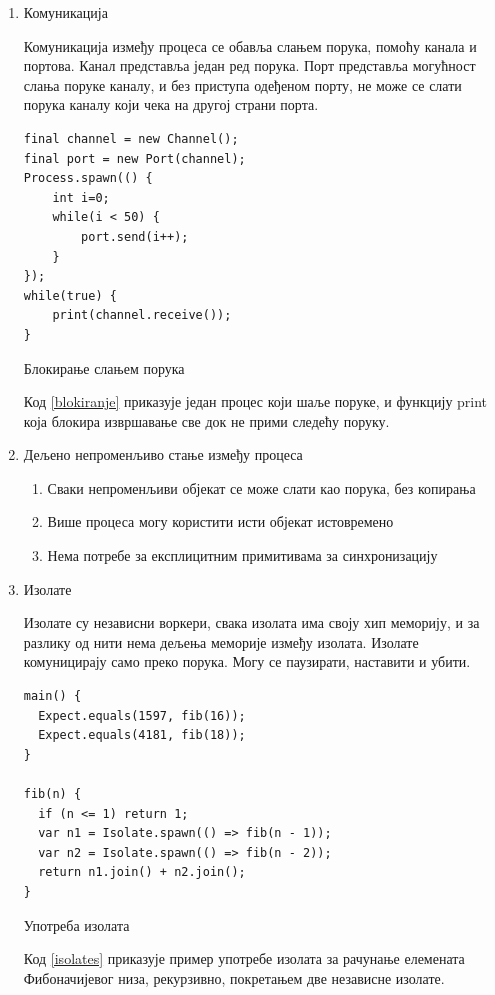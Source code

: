 \documentclass[12pt,oneside]{memoir}
\begin{document}
\begin{enumerate}
\item Комуникација

Комуникација између процеса се обавља слањем порука, помоћу канала и портова. Канал представља један ред порука. Порт представља могућност слања поруке каналу, и без приступа одеђеном порту, не може се слати порука каналу који чека на другој страни порта.

\begin{listing}
\begin{verbatim}
final channel = new Channel();
final port = new Port(channel);
Process.spawn(() {
	int i=0;
	while(i < 50) {
		port.send(i++);
	}
});
while(true) {
	print(channel.receive());
}
\end{verbatim}
\caption{Блокирање слањем порука}
\label{blokiranje}
\end{listing}
Код \ref{blokiranje} приказује један процес који шаље поруке, и функцију print која блокира извршавање све док не прими следећу поруку.

\item Дељено непроменљиво стање између процеса
\begin{enumerate}
\item Сваки непроменљиви објекат се може слати као порука, без копирања
\item Више процеса могу користити исти објекат истовремено
\item Нема потребе за експлицитним примитивама за синхронизацију
\end{enumerate}

\item Изолате

Изолате су независни воркери, свака изолата има своју хип меморију, и за разлику од нити нема дељења меморије између изолата. Изолате комуницирају само преко порука. Могу се паузирати, наставити и убити.

\begin{listing}
\begin{verbatim}
main() {
  Expect.equals(1597, fib(16));
  Expect.equals(4181, fib(18)); 
}

fib(n) {
  if (n <= 1) return 1;
  var n1 = Isolate.spawn(() => fib(n - 1));
  var n2 = Isolate.spawn(() => fib(n - 2));
  return n1.join() + n2.join();
}
\end{verbatim}
\caption{Употреба изолата}
\label{isolates}
\end{listing}
Код \ref{isolates} приказује пример употребе изолата за рачунање елемената Фибоначијевог низа, рекурзивно, покретањем две независне изолате.


\end{enumerate}
\end{document}
